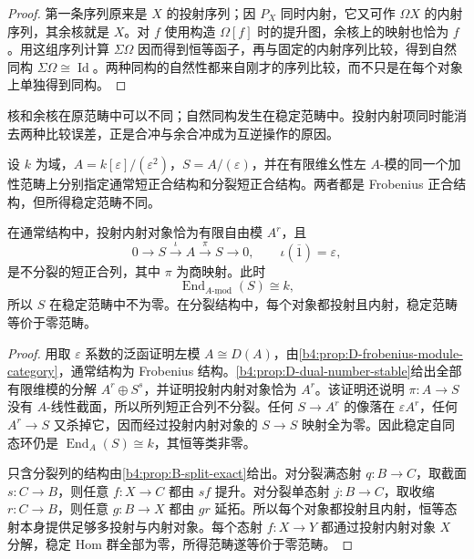 \begin{proof}
	第一条序列原来是 \(X\) 的投射序列；因 \(P_X\) 同时内射，它又可作 \(\Omega X\) 的内射序列，其余核就是 \(X\)。对 \(f\) 使用构造 \(\Omega[f]\) 时的提升图，余核上的映射也恰为 \(f\)。用这组序列计算 \(\Sigma\Omega\) 因而得到恒等函子，再与固定的内射序列比较，得到自然同构 \(\Sigma\Omega\cong\operatorname{Id}\)。两种同构的自然性都来自刚才的序列比较，而不只是在每个对象上单独得到同构。
\end{proof}

核和余核在原范畴中可以不同；自然同构发生在稳定范畴中。投射内射项同时能消去两种比较误差，正是合冲与余合冲成为互逆操作的原因。

\begin{proposition}\label{b4:prop:D-exact-structure-stable-comparison}
	设 \(k\) 为域，\(A=k[\varepsilon]/(\varepsilon^2)\)，\(S=A/(\varepsilon)\)，并在有限维幺性左 \(A\)-模的同一个加性范畴上分别指定通常短正合结构和分裂短正合结构。两者都是 Frobenius 正合结构，但所得稳定范畴不同。

	在通常结构中，投射内射对象恰为有限自由模 \(A^r\)，且
	\[
		0\longrightarrow S\xrightarrow{\iota}A\xrightarrow{\pi}S \longrightarrow0,\qquad\iota(\overline1)=\varepsilon,
	\]
	是不分裂的短正合列，其中 \(\pi\) 为商映射。此时
	\[
		\operatorname{End}_{\underline{A\text{-}\mathrm{mod}}}(S)\cong k,
	\]
	所以 \(S\) 在稳定范畴中不为零。在分裂结构中，每个对象都投射且内射，稳定范畴等价于零范畴。
\end{proposition}
\begin{proof}
	用取 \(\varepsilon\) 系数的泛函证明左模 \(A\cong D(A)\)，由\cref{b4:prop:D-frobenius-module-category}，通常结构为 Frobenius 结构。\cref{b4:prop:D-dual-number-stable}给出全部有限维模的分解 \(A^r\oplus S^s\)，并证明投射内射对象恰为 \(A^r\)。该证明还说明 \(\pi:A\to S\) 没有 \(A\)-线性截面，所以所列短正合列不分裂。任何 \(S\to A^r\) 的像落在 \(\varepsilon A^r\)，任何 \(A^r\to S\) 又杀掉它，因而经过投射内射对象的 \(S\to S\) 映射全为零。因此稳定自同态环仍是 \(\operatorname{End}_A(S)\cong k\)，其恒等类非零。

	只含分裂列的结构由\cref{b4:prop:B-split-exact}给出。对分裂满态射 \(q:B\to C\)，取截面 \(s:C\to B\)，则任意 \(f:X\to C\) 都由 \(sf\) 提升。对分裂单态射 \(j:B\to C\)，取收缩 \(r:C\to B\)，则任意 \(g:B\to X\) 都由 \(gr\) 延拓。所以每个对象都投射且内射，恒等态射本身提供足够多投射与内射对象。每个态射 \(f:X\to Y\) 都通过投射内射对象 \(X\) 分解，稳定 Hom 群全部为零，所得范畴遂等价于零范畴。
\end{proof}
